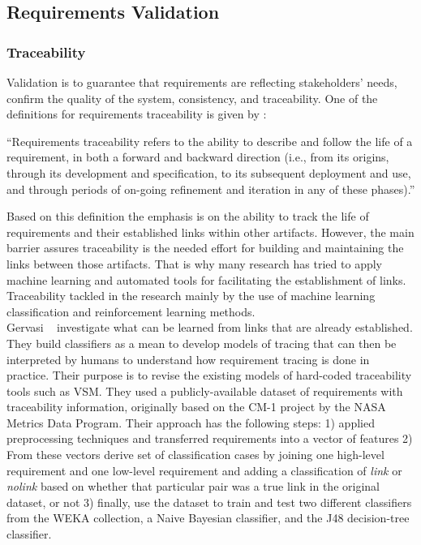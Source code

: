 \subsection{Requirements Validation}

\subsubsection{Traceability}

Validation is to guarantee that requirements are reflecting stakeholders' needs,
confirm the quality of the system, consistency, and traceability.
 One of the definitions for requirements traceability is given by
 \cite{Gotel:1994}:
\begin{displayquote} 
“Requirements traceability refers to the ability to describe and follow the life
of a requirement, in both a forward and backward direction (i.e., from its
origins, through its development and specification, to its subsequent deployment
and use, and through periods of on-going refinement and iteration in any of
these phases).”
\end{displayquote}
Based on this definition the emphasis is on the ability to track the life of
requirements and their established links within other artifacts. However, the
main barrier assures traceability is the needed effort for building and
maintaining the links between those artifacts. That is why many research has
tried to apply machine learning and automated tools for facilitating the
establishment of links\cite{Gervasi:2011}.
Traceability tackled in the research mainly by the use of machine learning
classification and reinforcement learning methods.\\

Gervasi \etal~\cite{Gervasi:2011} investigate what can be learned from links that are already established. They build classifiers as a mean to develop models of tracing that can then be interpreted by humans to understand how requirement tracing is done in practice. Their purpose is to revise the existing models of hard-coded traceability tools such as VSM. They used a publicly-available dataset of requirements with traceability information, originally based on the CM-1 project by the NASA Metrics Data Program. Their approach has the following steps: 1) applied preprocessing techniques and transferred requirements into a vector of features 2) From these vectors derive set of classification cases by joining one high-level requirement and one low-level requirement and adding a classification of \textit{link} or \textit{nolink} based on whether that particular pair was a true link in the original dataset, or not 3) finally, use the dataset to train and test two different classifiers from the WEKA collection, a Naive Bayesian classifier, and the J48 decision-tree classifier.\newline

